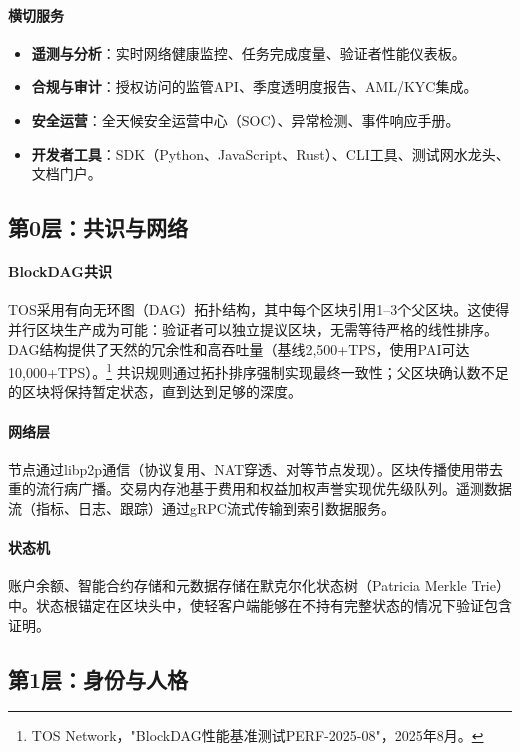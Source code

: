 \documentclass[11pt]{article}
\begin{document}
\paragraph{横切服务}
\begin{itemize}[noitemsep]
  \item \textbf{遥测与分析}：实时网络健康监控、任务完成度量、验证者性能仪表板。
  \item \textbf{合规与审计}：授权访问的监管API、季度透明度报告、AML/KYC集成。
  \item \textbf{安全运营}：全天候安全运营中心（SOC）、异常检测、事件响应手册。
  \item \textbf{开发者工具}：SDK（Python、JavaScript、Rust）、CLI工具、测试网水龙头、文档门户。
\end{itemize}

\subsection{第0层：共识与网络}
\paragraph{BlockDAG共识} TOS采用有向无环图（DAG）拓扑结构，其中每个区块引用1--3个父区块。这使得并行区块生产成为可能：验证者可以独立提议区块，无需等待严格的线性排序。DAG结构提供了天然的冗余性和高吞吐量（基线2,500+TPS，使用PAI可达10,000+TPS）。\footnote{TOS Network，"BlockDAG性能基准测试PERF-2025-08"，2025年8月。} 共识规则通过拓扑排序强制实现最终一致性；父区块确认数不足的区块将保持暂定状态，直到达到足够的深度。

\paragraph{网络层} 节点通过libp2p通信（协议复用、NAT穿透、对等节点发现）。区块传播使用带去重的流行病广播。交易内存池基于费用和权益加权声誉实现优先级队列。遥测数据流（指标、日志、跟踪）通过gRPC流式传输到索引数据服务。

\paragraph{状态机} 账户余额、智能合约存储和元数据存储在默克尔化状态树（Patricia Merkle Trie）中。状态根锚定在区块头中，使轻客户端能够在不持有完整状态的情况下验证包含证明。

\subsection{第1层：身份与人格}
\end{document}
